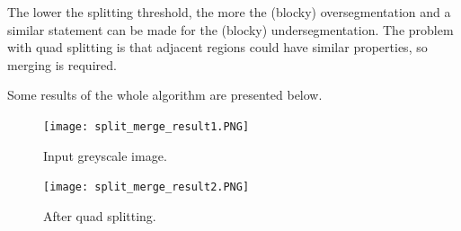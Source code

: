 \documentclass[a4paper]{article}
\begin{document}

The lower the splitting threshold, the more the (blocky) oversegmentation and a similar statement can be made for the (blocky) undersegmentation. The problem with quad splitting is that adjacent regions could have similar properties, so merging is required.



Some results of the whole algorithm are presented below.

\begin{multicols}{2}
\begin{figure}[H]
	\centering %
	\texttt{[image: split\_merge\_result1.PNG]}
    \caption{Input greyscale image.} 
\end{figure}
\columnbreak
\begin{figure}[H]
	\centering %
	\texttt{[image: split\_merge\_result2.PNG]}
    \caption{After quad splitting.} 
\end{figure}
\end{multicols}
\end{document}
